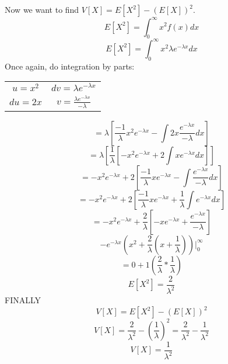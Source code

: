 \documentclass{article}
\begin{document}
	Now we want to find $V[X] = E[X^2] - (E[X])^2$.
	\begin{displaymath}
		E[X^2] = \int_{0}^{\infty}x^2 f(x)dx
	\end{displaymath}
	\begin{displaymath}
		E[X^2] = \int_{0}^{\infty}x^2 \lambda e^{-\lambda x}dx
	\end{displaymath}
	Once again, do integration by parts:
	\begin{tabular}{ c c }
		$u = x^2$ & $dv= \lambda e^{-\lambda x}$ \\
		$du=2x$ & $v=\frac{\lambda e^{-\lambda x}}{-\lambda}$
	\end{tabular}
	\begin{displaymath}
		= \lambda\left[\frac{-1}{\lambda}x^2e^{-\lambda x}-\int2x\frac{e^{-\lambda x}}{-\lambda} dx
		\right]
	\end{displaymath}
	\begin{displaymath}
		= \lambda\left[\frac{1}{\lambda}\left[-x^2e^{-\lambda x}+2\int xe^{-\lambda x} dx\right]\right]
	\end{displaymath}
	\begin{displaymath}
		= -x^2e^{-\lambda x}+2\left[\frac{-1}{\lambda}xe^{-\lambda x}-\int\frac{e^{-\lambda x}}{-
		\lambda}dx\right]
	\end{displaymath}
	\begin{displaymath}
		= -x^2e^{-\lambda x}+2\left[\frac{-1}{\lambda}xe^{-\lambda x}+\frac{1}{\lambda}\int e^{-
		\lambda x}dx\right]
	\end{displaymath}
	\begin{displaymath}
		= -x^2e^{-\lambda x} + \frac{2}{\lambda}\left[-xe^{-\lambda x} + \frac{e^{-\lambda x}}{-
		\lambda}\right]
	\end{displaymath}
	\begin{displaymath}
		-e^{-\lambda x}\left(x^2+\frac{2}{\lambda}(x+\frac{1}{\lambda})\right)|_{0}^{\infty}
	\end{displaymath}
	\begin{displaymath}
		= 0 + 1\left(\frac{2}{\lambda} * \frac{1}{\lambda}\right)
	\end{displaymath}
	\begin{displaymath}
		E[X^2] = \frac{2}{\lambda^2}
	\end{displaymath}
	 FINALLY
	 \begin{displaymath}
	 	V[X] = E[X^2] - \left(E[X]\right)^2
	\end{displaymath}
	\begin{displaymath}
		V[X] = \frac{2}{\lambda^2} - \left(\frac{1}{\lambda}\right)^2 = \frac{2}{\lambda^2} - \frac{1}
		{\lambda^2}
	\end{displaymath}
	\begin{displaymath}
		V[X] = \frac{1}{\lambda^2}
	\end{displaymath}
	
\end{document}
